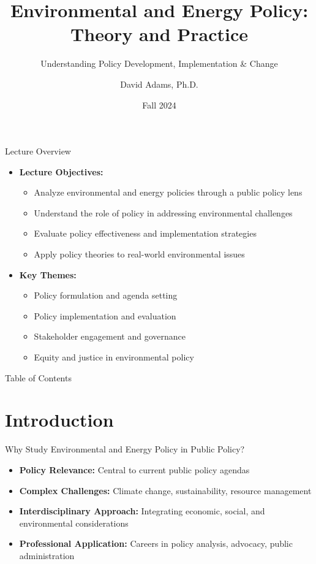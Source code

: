 \documentclass[11pt, aspectratio=169]{beamer}
\title{Environmental and Energy Policy:\\ Theory and Practice}
\subtitle{Understanding Policy Development, Implementation \& Change}
\author{David Adams, Ph.D.}
\institute{Division of Politics, Administration, and Justice\\
    Cal State Fullerton}
\date{Fall 2024}
\begin{document}
\frame{\titlepage}

\begin{frame}{Lecture Overview}
    \begin{itemize}
        \item \textbf{Lecture Objectives:}
            \begin{itemize}
                \item Analyze environmental and energy policies through a public policy lens
                \item Understand the role of policy in addressing environmental challenges
                \item Evaluate policy effectiveness and implementation strategies
                \item Apply policy theories to real-world environmental issues
            \end{itemize}
        \item \textbf{Key Themes:}
            \begin{itemize}
                \item Policy formulation and agenda setting
                \item Policy implementation and evaluation
                \item Stakeholder engagement and governance
                \item Equity and justice in environmental policy
            \end{itemize}
    \end{itemize}
\end{frame}

\begin{frame}{Table of Contents}
    \tableofcontents
\end{frame}

\section{Introduction}

\begin{frame}{Why Study Environmental and Energy Policy in Public Policy?}
    \begin{itemize}
        \item \textbf{Policy Relevance:} Central to current public policy agendas
        \item \textbf{Complex Challenges:} Climate change, sustainability, resource management
        \item \textbf{Interdisciplinary Approach:} Integrating economic, social, and environmental considerations
        \item \textbf{Professional Application:} Careers in policy analysis, advocacy, public administration
    \end{itemize}
\end{frame}
\end{document}
